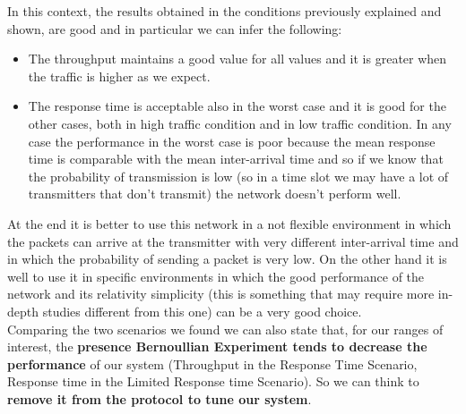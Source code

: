 \noindent In this context, the results obtained in the conditions previously explained and shown, are good and in particular we can infer the following:
\begin{itemize}
	\item The throughput maintains a good value for all values and it is greater when the traffic is higher as we expect.
	
	\item The response time is acceptable also in the worst case and it is good for the other cases, both in high traffic condition and in low traffic condition. In any case the performance in the worst case is poor because the mean response time is comparable with the mean inter-arrival time and so if we know that the probability of transmission is low (so in a time slot we may have a lot of transmitters that don't transmit) the network doesn't perform well.
\end{itemize}

\noindent At the end it is better to use this network in a not flexible environment in which the packets can arrive at the transmitter with very different inter-arrival time and in which the probability of sending a packet is very low. On the other hand it is well to use it in specific environments in which the good performance of the network and its relativity simplicity (this is something that may require more in-depth studies different from this one) can be a very good choice. \\

Comparing the two scenarios we found we can also state that, for our ranges of interest, the \textbf{presence Bernoullian Experiment tends to decrease the performance} of our system (Throughput in the Response Time Scenario, Response time in the Limited Response time Scenario). So we can think to \textbf{remove it from the protocol to tune our system}.